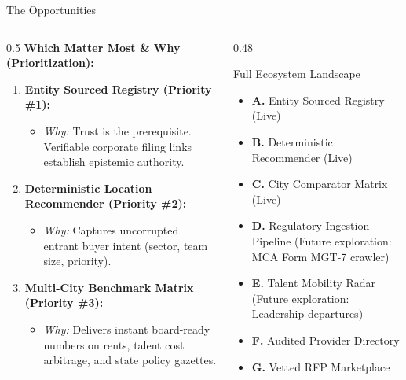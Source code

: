 \documentclass[aspectratio=169, 10pt]{beamer}
\begin{document}
\begin{frame}{The Opportunities}
  \begin{columns}
    \begin{column}{0.5\textwidth}
      \textbf{Which Matter Most \& Why (Prioritization):}
      \begin{enumerate}
        \item \textbf{Entity Sourced Registry (Priority \#1):}
          \begin{itemize}
            \item \textit{Why:} Trust is the prerequisite. Verifiable corporate filing links establish epistemic authority.
          \end{itemize}
        \item \textbf{Deterministic Location Recommender (Priority \#2):}
          \begin{itemize}
            \item \textit{Why:} Captures uncorrupted entrant buyer intent (sector, team size, priority).
          \end{itemize}
        \item \textbf{Multi-City Benchmark Matrix (Priority \#3):}
          \begin{itemize}
            \item \textit{Why:} Delivers instant board-ready numbers on rents, talent cost arbitrage, and state policy gazettes.
          \end{itemize}
      \end{enumerate}
    \end{column}
    \begin{column}{0.48\textwidth}
      \begin{block}{Full Ecosystem Landscape}
        \begin{itemize}
          \item \textbf{A.} Entity Sourced Registry (Live)
          \item \textbf{B.} Deterministic Recommender (Live)
          \item \textbf{C.} City Comparator Matrix (Live)
          \item \textbf{D.} Regulatory Ingestion Pipeline (Future exploration: MCA Form MGT-7 crawler)
          \item \textbf{E.} Talent Mobility Radar (Future exploration: Leadership departures)
          \item \textbf{F.} Audited Provider Directory
          \item \textbf{G.} Vetted RFP Marketplace
        \end{itemize}
      \end{block}
    \end{column}
  \end{columns}
\end{frame}
\end{document}

